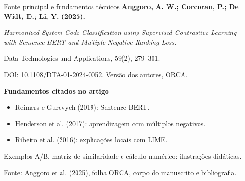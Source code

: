 \documentclass[aspectratio=169,11pt]{beamer}
\newcommand{\secao}{LEITURA DE ARTIGO}
\newcommand{\fonte}[1]{\vfill\par{\fontsize{7}{8}\selectfont\color{Cinza} Fonte: #1\par}}
\begin{document}
\renewcommand{\secao}{REFERÊNCIAS}
\begin{frame}[t]{Fonte principal e fundamentos técnicos}
\normalfont\sffamily
\textbf{Anggoro, A. W.; Corcoran, P.; De Widt, D.; Li, Y. (2025).}\par
\par\vspace{2mm}
{\small\itshape Harmonized System Code Classification using Supervised Contrastive Learning with Sentence BERT and Multiple Negative Ranking Loss.\par}
\par\vspace{2mm}
{\small Data Technologies and Applications, 59(2), 279--301.\par
\href{https://doi.org/10.1108/DTA-01-2024-0052}{DOI: 10.1108/DTA-01-2024-0052}. Versão dos autores, ORCA.\par}
\par\vspace{3mm}
\textbf{Fundamentos citados no artigo}\par\vspace{2mm}
\begin{itemize}
\item Reimers e Gurevych (2019): Sentence-BERT.
\item Henderson et al. (2017): aprendizagem com múltiplos negativos.
\item Ribeiro et al. (2016): explicações locais com LIME.
\end{itemize}
\par\vspace{3mm}
{\small Exemplos A/B, matriz de similaridade e cálculo numérico: ilustrações didáticas.}
\fonte{Anggoro et al. (2025), folha ORCA, corpo do manuscrito e bibliografia.}
\end{frame}
\end{document}
